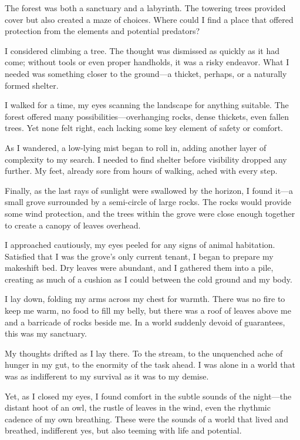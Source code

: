 \documentclass[]{article}
\begin{document}
The forest was both a sanctuary and a labyrinth. The towering trees provided cover but also created a maze of choices. Where could I find a place that offered protection from the elements and potential predators?

I considered climbing a tree. The thought was dismissed as quickly as it had come; without tools or even proper handholds, it was a risky endeavor. What I needed was something closer to the ground—a thicket, perhaps, or a naturally formed shelter.

I walked for a time, my eyes scanning the landscape for anything suitable. The forest offered many possibilities—overhanging rocks, dense thickets, even fallen trees. Yet none felt right, each lacking some key element of safety or comfort.

As I wandered, a low-lying mist began to roll in, adding another layer of complexity to my search. I needed to find shelter before visibility dropped any further. My feet, already sore from hours of walking, ached with every step.

Finally, as the last rays of sunlight were swallowed by the horizon, I found it—a small grove surrounded by a semi-circle of large rocks. The rocks would provide some wind protection, and the trees within the grove were close enough together to create a canopy of leaves overhead.

I approached cautiously, my eyes peeled for any signs of animal habitation. Satisfied that I was the grove's only current tenant, I began to prepare my makeshift bed. Dry leaves were abundant, and I gathered them into a pile, creating as much of a cushion as I could between the cold ground and my body.

I lay down, folding my arms across my chest for warmth. There was no fire to keep me warm, no food to fill my belly, but there was a roof of leaves above me and a barricade of rocks beside me. In a world suddenly devoid of guarantees, this was my sanctuary.

My thoughts drifted as I lay there. To the stream, to the unquenched ache of hunger in my gut, to the enormity of the task ahead. I was alone in a world that was as indifferent to my survival as it was to my demise.

Yet, as I closed my eyes, I found comfort in the subtle sounds of the night—the distant hoot of an owl, the rustle of leaves in the wind, even the rhythmic cadence of my own breathing. These were the sounds of a world that lived and breathed, indifferent yes, but also teeming with life and potential.
\end{document}
